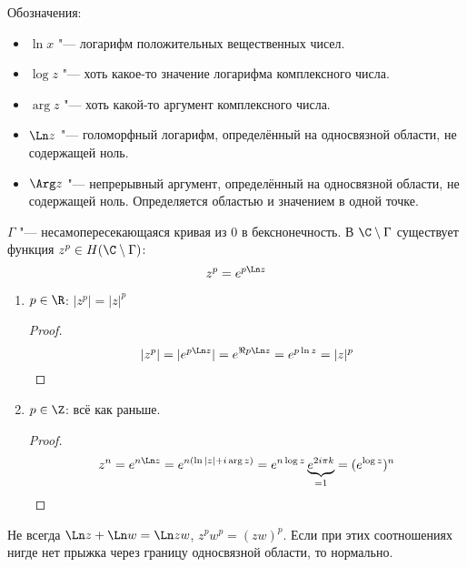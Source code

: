 Обозначения:
\begin{itemize}
	\item $\ln x$ "--- логарифм положительных вещественных чисел.
	\item $\log z$ "--- хоть какое-то значение логарифма комплексного числа.
	\item $\arg z$ "--- хоть какой-то аргумент комплексного числа.
	\item $\Ln z$ "--- голоморфный логарифм, определённый на односвязной области, не содержащей ноль.
	\item $\Arg z$ "--- непрерывный аргумент, определённый на односвязной области, не содержащей ноль.
		Определяется областью и значением в одной точке.
\end{itemize}

\begin{conseq}
	$\Gamma$ "--- несамопересекающаяся кривая из 0 в бекснонечность.
	В $\C \setminus \Gamma$ существует функция $z^p \in H(\C \setminus \Gamma)$:
	\[ z^p = e^{p\Ln z} \]
	\begin{enumerate}
	\item
		$p \in \R$: $|z^p| = |z|^p$
		\begin{proof}
			\[ |z^p| = |e^{p\Ln z}| = e^{\Re p\Ln z} = e^{p\ln z} = |z|^p \]
		\end{proof}

	\item
		$p \in \Z$: всё как раньше.
		\begin{proof}
			\[ z^n = e^{n\Ln z} = e^{n(\ln |z| + i\arg z)} = e^{n\log z} \underbrace{e^{2i\pi k}}_{=1} = (e^{\log z})^n \]
		\end{proof}
	\end{enumerate}

	\begin{Rem}
		Не всегда $\Ln z + \Ln w = \Ln zw$, $z^pw^p = (zw)^p$.
		Если при этих соотношениях нигде нет прыжка через границу односвязной области, то нормально.
	\end{Rem}
\end{conseq}

